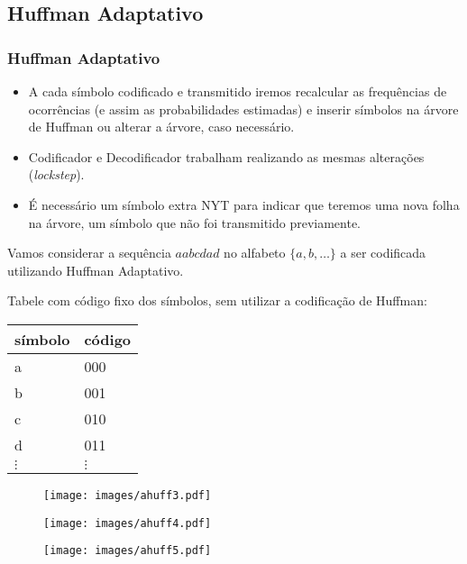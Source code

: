 \subsection{Huffman Adaptativo}
\begin{frame}[allowframebreaks]
  \frametitle{Huffman Adaptativo}
  \begin{itemize}
  \item A cada símbolo codificado e transmitido iremos recalcular as frequências de ocorrências 
	(e assim as probabilidades estimadas) e inserir símbolos na árvore de Huffman ou alterar
	a árvore, caso necessário.
  \item Codificador e Decodificador trabalham realizando as mesmas alterações (\textit{lockstep}).
  \item É necessário um símbolo extra NYT para indicar que teremos uma nova folha na árvore, um
	símbolo que não foi transmitido previamente.
  \end{itemize}

  \begin{example}
  Vamos considerar a sequência $aabcdad$ no alfabeto $\{a,b,\ldots\}$ a ser codificada utilizando
  Huffman Adaptativo.
  
  Tabele com código fixo dos símbolos, sem utilizar a codificação de Huffman:

	\begin{tabular}{ll}
	símbolo & código \\ \hline
	a	& 000	\\
	b	& 001	\\
	c	& 010	\\
	d	& 011 	\\
	$\vdots$& $\vdots$
	\end{tabular}

  \examplebreak
                \begin{figure}[h!]
                \centering
                \texttt{[image: images/ahuff3.pdf]}
                \label{fig:ahuff3}
                \end{figure}
  \examplebreak
                \begin{figure}[h!]
                \centering
                \texttt{[image: images/ahuff4.pdf]}
                \label{fig:ahuff4}
                \end{figure}

  \examplebreak
                \begin{figure}[h!]
                \centering
                \texttt{[image: images/ahuff5.pdf]}
                \label{fig:ahuff5}
                \end{figure}


\end{example}
\end{frame}
